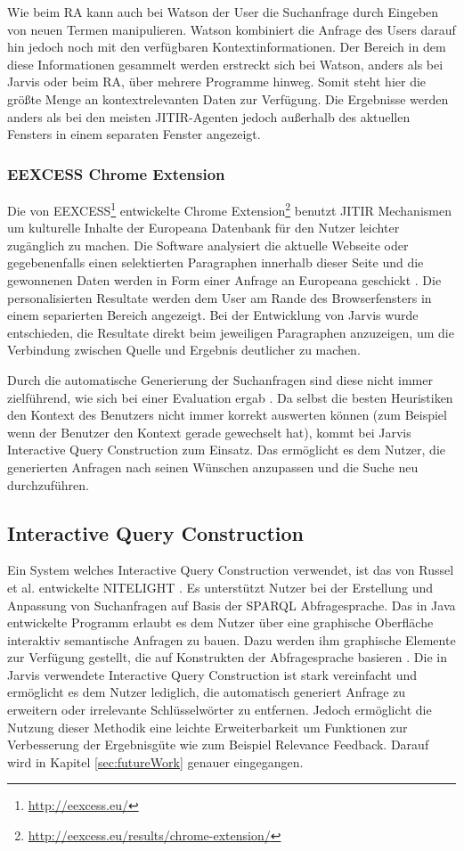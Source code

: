  	Wie beim RA kann auch bei Watson der User die Suchanfrage durch Eingeben von neuen Termen manipulieren. Watson kombiniert die Anfrage des Users darauf hin jedoch noch mit den verfügbaren Kontextinformationen. Der Bereich in dem diese Informationen gesammelt werden erstreckt sich bei Watson, anders als bei Jarvis oder beim RA, über mehrere Programme hinweg. Somit steht hier die größte Menge an kontextrelevanten Daten zur Verfügung. Die Ergebnisse werden anders als bei den meisten JITIR-Agenten jedoch außerhalb des aktuellen Fensters in einem separaten Fenster angezeigt.

 	\subsubsection{EEXCESS Chrome Extension}
 	Die von EEXCESS\footnote{\url{http://eexcess.eu/}} entwickelte Chrome Extension\footnote{\url{http://eexcess.eu/results/chrome-extension/}} benutzt JITIR Mechanismen um kulturelle Inhalte der Europeana Datenbank für den Nutzer leichter zugänglich zu machen. Die Software analysiert die aktuelle Webseite oder gegebenenfalls einen selektierten Paragraphen innerhalb dieser Seite und die gewonnenen Daten werden in Form einer Anfrage an Europeana geschickt \cite{schlottererweb}. Die personalisierten Resultate werden dem User am Rande des Browserfensters in einem separierten Bereich angezeigt. Bei der Entwicklung von Jarvis wurde entschieden, die Resultate direkt beim jeweiligen Paragraphen anzuzeigen, um die Verbindung zwischen Quelle und Ergebnis deutlicher zu machen.

 	Durch die automatische Generierung der Suchanfragen sind diese nicht immer zielführend, wie sich bei einer Evaluation ergab \cite{eexcessevaluation}. Da selbst die besten Heuristiken den Kontext des Benutzers nicht immer korrekt auswerten können (zum Beispiel wenn der Benutzer den Kontext gerade gewechselt hat), kommt bei Jarvis Interactive Query Construction zum Einsatz. Das ermöglicht es dem Nutzer, die generierten Anfragen nach seinen Wünschen anzupassen und die Suche neu durchzuführen.

\subsection{Interactive Query Construction}
Ein System welches Interactive Query Construction verwendet, ist das von Russel et al. entwickelte NITELIGHT \cite{russell2008nitelight}. Es unterstützt Nutzer bei der Erstellung und Anpassung von Suchanfragen auf Basis der SPARQL \cite{sparql} Abfragesprache. Das in Java entwickelte Programm erlaubt es dem Nutzer über eine graphische Oberfläche interaktiv semantische Anfragen zu bauen. Dazu werden ihm graphische Elemente zur Verfügung gestellt, die auf Konstrukten der Abfragesprache basieren \cite{russell2008nitelight}. Die in Jarvis verwendete Interactive Query Construction ist stark vereinfacht und ermöglicht es dem Nutzer lediglich, die automatisch generiert Anfrage zu erweitern oder irrelevante Schlüsselwörter zu entfernen. Jedoch ermöglicht die Nutzung dieser Methodik eine leichte Erweiterbarkeit um Funktionen zur Verbesserung der Ergebnisgüte wie zum Beispiel Relevance Feedback. Darauf wird in Kapitel \ref{sec:futureWork} genauer eingegangen.

